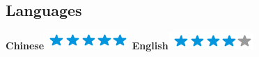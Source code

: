\documentclass[]{friggeri-cv}
\begin{document}
\begin{aside}
  \section{Languages}
    \textbf{Chinese}\includegraphics[scale=0.40]{img/5stars.png}
    \textbf{English}\includegraphics[scale=0.40]{img/4stars.png}
\end{aside}

% 
\end{document}
